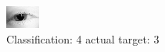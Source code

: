 \begin{figure}[h!]
\begin{center}
\includegraphics[width=0.60\columnwidth]{figures/ID51_class_4_target_3.png}
\end{center}
\caption{ Classification: 4 actual target: 3}
\label{fig:ID51_class_4_target_3}
\end{figure}
